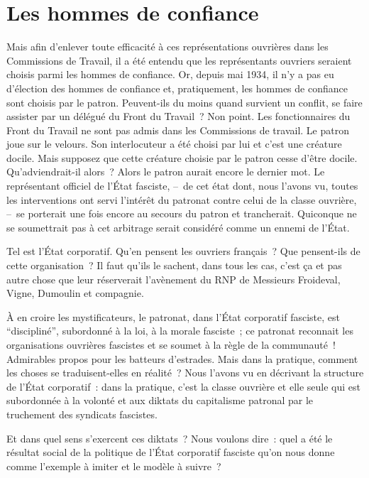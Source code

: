 \documentclass[french,twoside]{book} %
\begin{document}
\section[Les hommes de confiance]{Les hommes de confiance}
\noindent Mais afin d’enlever toute efficacité à ces représentations ouvrières dans les Commissions de Travail, il a été entendu que les représentants ouvriers seraient choisis parmi les hommes de confiance. Or, depuis mai 1934, il n’y a pas eu d’élection des hommes de confiance et, pratiquement, les hommes de confiance sont choisis par le patron. Peuvent-ils du moins quand survient un conflit, se faire assister par un délégué du Front du Travail ? Non point. Les fonctionnaires du Front du Travail ne sont pas admis dans les Commissions de travail. Le patron joue sur le velours. Son interlocuteur a été choisi par lui et c’est une créature docile. Mais supposez que cette créature choisie par le patron cesse d’être docile. Qu’adviendrait-il alors ? Alors le patron aurait encore le dernier mot. Le représentant officiel de l’État fasciste, – de cet état dont, nous l’avons vu, toutes les interventions ont servi l’intérêt du patronat contre celui de la classe ouvrière, – se porterait une fois encore au secours du patron et trancherait. Quiconque ne se soumettrait pas à cet arbitrage serait considéré comme un ennemi de l’État.\par
Tel est l’État corporatif. Qu’en pensent les ouvriers français ? Que pensent-ils de cette organisation ? Il faut qu’ils le sachent, dans tous les cas, c’est ça et pas autre chose que leur réserverait l’avènement du RNP de Messieurs Froideval, Vigne, Dumoulin et compagnie.\par
À en croire les mystificateurs, le patronat, dans l’État corporatif fasciste, est “discipliné”, subordonné à la loi, à la morale fasciste ; ce patronat reconnait les organisations ouvrières fascistes et se soumet à la règle de la communauté ! Admirables propos pour les batteurs d’estrades. Mais dans la pratique, comment les choses se traduisent-elles en réalité ? Nous l’avons vu en décrivant la structure de l’État corporatif : dans la pratique, c’est la classe ouvrière et elle seule qui est subordonnée à la volonté et aux diktats du capitalisme patronal par le truchement des syndicats fascistes.\par
Et dans quel sens s’exercent ces diktats ? Nous voulons dire : quel a été le résultat social de la politique de l’État corporatif fasciste qu’on nous donne comme l’exemple à imiter et le modèle à suivre ?
\end{document}
